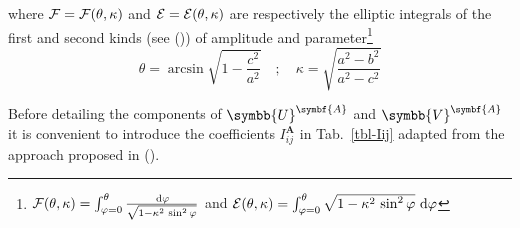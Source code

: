 \documentclass[
  a4paper,
  numbers=noendperiod,
  DIV=12]{scrreprt}
\newcommand{\uu}[1]{{\symbf{{#1}}}}
\newcommand{\uuuu}[1]{{\symbb{{#1}}}}
\newcommand{\ud}{{\,\mathrm{d}}}
\begin{document}
where \({\cal F}={\cal F}(\theta,\kappa)\) and
\({\cal E}={\cal E}(\theta,\kappa)\) are respectively the elliptic
integrals of the first and second kinds (see
()) of
amplitude and parameter\footnote{\({\cal F}(\theta,\kappa)=\int_{\varphi=0}^\theta \frac{\ud\varphi}{\sqrt{1-\kappa^2\,\sin^2\varphi}}\)
  and
  \({\cal E}(\theta,\kappa)=\int_{\varphi=0}^\theta \sqrt{1-\kappa^2\,\sin^2\varphi}\,\ud\varphi\)}
\[
\theta=\arcsin{\sqrt{1-\frac{c^2}{a^2}}}
\quad;\quad
\kappa=\sqrt{\frac{a^2-b^2}{a^2-c^2}}
\]

Before detailing the components of \(\uuuu{U}^{\uu{A}}\) and
\(\uuuu{V}^{\uu{A}}\) it is convenient to introduce the coefficients
\(I^{\uu{A}}_{ij}\) in Tab.~\ref{tbl-Iij} adapted from the approach
proposed in ().
\end{document}
